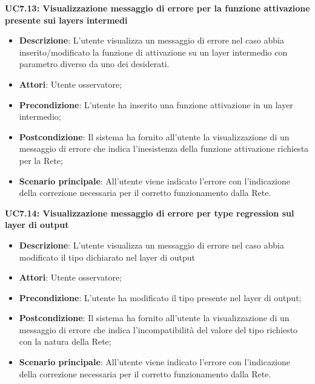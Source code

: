 \textbf{UC7.13: Visualizzazione messaggio di errore per la funzione attivazione presente sui layers intermedi}\mbox{}
\label{UC7.13: Visualizzazione messaggio di errore per la funzione attivazione presente sui layers intermedi}
\noindent
\begin{itemize}
\item \textbf{Descrizione}: L'utente visualizza un messaggio di errore nel caso abbia inserito/modificato  la funzione di attivazione su un layer intermedio con parametro diverso da uno dei desiderati.
\item \textbf{Attori}: Utente osservatore;
\item \textbf{Precondizione}: L'utente ha inserito una funzione attivazione in un layer intermedio;
\item \textbf{Postcondizione}: Il sistema ha fornito all'utente la visualizzazione di un messaggio di errore che indica l'inesistenza della funzione attivazione richiesta per la Rete;
\item \textbf{Scenario principale}: All'utente viene indicato l'errore con l'indicazione della correzione necessaria per il corretto funzionamento dalla Rete.
\end{itemize}

\textbf{UC7.14: Visualizzazione messaggio di errore per type regression sul layer di output}\mbox{}
\label{UC7.14: Visualizzazione messaggio di errore per type regression sul layer di output}
\noindent
\begin{itemize}
\item \textbf{Descrizione}: L'utente visualizza un messaggio di errore nel caso abbia modificato il tipo dichiarato nel layer di output
\item \textbf{Attori}: Utente osservatore;
\item \textbf{Precondizione}: L'utente ha modificato il tipo presente nel layer di output;
\item \textbf{Postcondizione}: Il sistema ha fornito all'utente la visualizzazione di un messaggio di errore che indica l'incompatibilit\`a del valore del tipo richiesto con la natura della Rete;
\item \textbf{Scenario principale}: All'utente viene indicato l'errore con l'indicazione della correzione necessaria per il corretto funzionamento dalla Rete.
\end{itemize}

